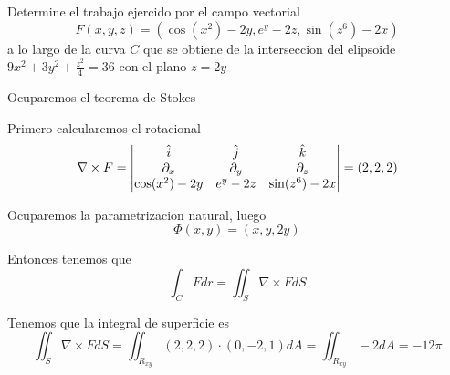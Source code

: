 \message{ !name(MAT024.tex)}\documentclass[../main.tex]{subfiles}
\begin{document}
\begin{problem}
  Determine el trabajo ejercido por el campo vectorial
  \begin{equation*}
    F(x, y, z) = (\cos(x^{2}) - 2y, e^{y} - 2z, \sin(z^{6}) - 2x)
  \end{equation*}
  a lo largo de la curva $C$ que se obtiene de la interseccion del elipsoide $9x^{2} + 3y^{2} + \frac{z^{2}}{4} = 36$ con el plano $z = 2y$
\end{problem}
\begin{solution}
Ocuparemos el teorema de Stokes

Primero calcularemos el rotacional
\begin{equation*}
  \nabla \times F = \begin{vmatrix} \hat{i} & \hat{j} & \hat{k}\\ \partial_x & \partial_y & \partial_z\\ \cos(x^{2}) - 2y & e^{y} - 2z & \sin(z^{6}) - 2x\end{vmatrix} = (2, 2, 2)
\end{equation*}

Ocuparemos la parametrizacion natural, luego
\begin{equation*}
  \Phi(x, y) = (x, y, 2y)
\end{equation*}

Entonces tenemos que
\begin{equation*}
  \int_{C} F dr = \iint_{S} \nabla \times F dS
\end{equation*}

Tenemos que la integral de superficie es
\begin{equation*}
  \iint_{S} \nabla \times F dS = \iint_{R_{xy}}(2, 2, 2) \cdot (0, -2, 1) dA = \iint_{R_{xy}} -2 dA = -12\pi
\end{equation*}

\end{solution}
\end{document}
